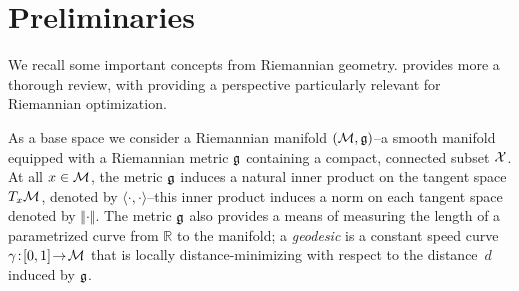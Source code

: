 \vspace{-.0cm}
\section{Preliminaries}\label{sec:background}
\vspace{-1.22pt}
We recall some important concepts from Riemannian geometry. \citet{do2016differential}  provides more a thorough review, with \citet{absil2009optimization} providing a perspective particularly relevant for Riemannian optimization.

As a base space we consider a Riemannian manifold $(\mathcal{M}, \mathfrak{g})$--a smooth manifold equipped with a Riemannian metric $\mathfrak{g}$ containing a compact, connected subset $\mathcal{X}$. At all $x \in \mathcal{M}$, the metric $\mathfrak{g}$ induces a natural inner product on the tangent space $T_{x} \mathcal{M}$, denoted by $\langle\cdot,\cdot\rangle$--this inner product induces a norm on each tangent space denoted by $\Vert \cdot \Vert$. The metric $\mathfrak{g}$ also provides a means of measuring the length of a parametrized curve from $\mathbb{R}$ to the manifold; a \emph{geodesic} is a constant speed curve $\gamma\! :\! [0,1]\! \to\! \mathcal{M}$ that is locally distance-minimizing with respect to the distance~$d$ induced by $\mathfrak{g}$.

